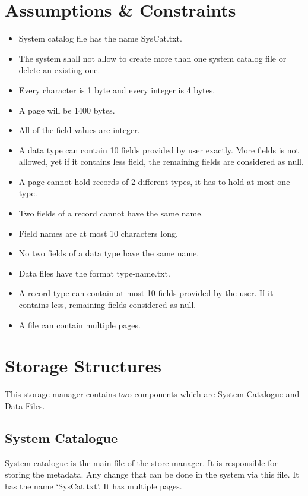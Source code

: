 \documentclass[12pt,a4paper]{article}
\begin{document}
\section{Assumptions \& Constraints}
        \begin{itemize}
            \item System catalog file has the name SysCat.txt.
            \item The system shall not allow to create more than one system catalog file or delete an existing one.
            \item Every character is 1 byte and every integer is 4 bytes.
            \item A page will be 1400 bytes.
            \item All of the field values are integer.
            \item A data type can contain 10 fields provided by user exactly. More fields is not allowed, yet if it contains less field, the remaining fields are considered as null.
            \item A page cannot hold records of 2 different types, it has to hold at most one type. 
            \item Two fields of a record cannot have the same name. 
            \item Field names are at most 10 characters long.
            \item No two fields of a data type have the same name.
            \item Data files have the format type-name.txt.
            \item  A record type can contain at most 10 fields provided by the user. If it contains less,
            remaining fields considered as null. 
            \item A file can contain multiple pages.
            
        \end{itemize}

\section{Storage Structures}
    This storage manager contains two components which are System Catalogue and Data Files. 
    \subsection{System Catalogue}
       System catalogue is the main file of the store manager. It is responsible for storing the metadata. Any change that can be done in the system via this file. It has the name ‘SysCat.txt’. It has multiple pages. 
\end{document}
